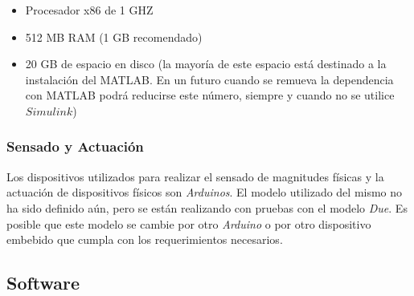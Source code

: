 \documentclass[a4paper,10pt]{article}
\begin{document}
        \begin{itemize}
            \item Procesador x86 de 1 GHZ
            \item 512 MB RAM (1 GB recomendado)
            \item 20 GB de espacio en disco (la mayoría de este espacio está destinado a la instalación del MATLAB. En un futuro cuando
                se remueva la dependencia con MATLAB podrá reducirse este número, siempre y cuando no se utilice $\mathit{Simulink}$)
        \end{itemize}

    \subsubsection{Sensado y Actuación}
        Los dispositivos utilizados para realizar el sensado de magnitudes físicas y la actuación de dispositivos físicos son
        \textit{Arduinos}. El modelo utilizado del mismo no ha sido definido aún, pero se están realizando con pruebas con el modelo
        \textit{Due}. Es posible que este modelo se cambie por otro \textit{Arduino} o por otro dispositivo embebido que cumpla con los
        requerimientos necesarios.

    \subsection{Software}
\end{document}
